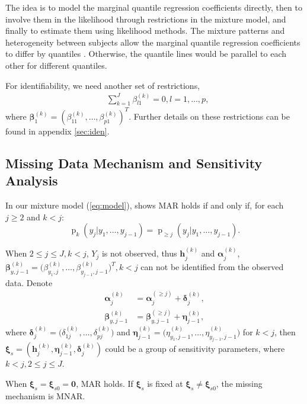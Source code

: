\documentclass[12pt]{article}
\DeclareMathOperator{\pr}{p}
\begin{document}
The idea is to model the marginal quantile regression coefficients
directly, then to involve them in the likelihood through restrictions
in the mixture model, and finally to estimate them using likelihood
methods. The mixture patterns and heterogeneity between subjects allow
the marginal quantile regression coefficients to differ by quantiles
. Otherwise, the quantile lines would be parallel to each other for
different quantiles.

For identifiability, we need another set of restrictions,
\begin{align*}
  & \sum_{k=1}^J \beta_{l1}^{(k)} = 0, l = 1,\ldots, p,
\end{align*}
where $\bm \beta_1^{(k)} = (\beta_{11}^{(k)}, \ldots,
\beta_{p1}^{(k)})^{T}$. Further details on these restrictions can be
found in appendix \ref{sec:iden}.

\subsection{Missing Data Mechanism and Sensitivity Analysis}
\label{sec:sa}

In our mixture model (\ref{eq:model}), \citep{molen1998} shows MAR
holds if and only if, for each $j \geq 2$ and $k < j$:
\begin{equation}
  \label{eq:molen}
  \pr_k(y_j|y_1, \ldots, y_{j-1}) = \pr_{\geq j}(y_j|y_1, \ldots, y_{j-1}).
\end{equation}

When $2 \leq j \leq J, k < j$, $Y_j$ is not observed, thus $\bm
h_j^{(k)}$ and $\bm \alpha_j^{(k)}$, $ \bm \beta_{y, j-1}^{(k)} =
\big(\beta_{y_1,j}^{(k)}, \ldots, \beta_{y_{j-1},j-1}^{(k)} \big)^T, k
< j$ can not be identified from the observed data. Denote
\begin{align*}
  \bm \alpha_j^{(k)} &= \bm \alpha_j^{(\geq j)} + \bm \delta_{j}^{(k)}, \\
  \bm \beta_{y, j-1}^{(k)} &= \bm \beta_{y, j-1}^{(\geq j)} + \bm
  \eta_{j-1}^{(k)},
\end{align*}
where $\bm \delta_j^{(k)} = \big( \delta_{1j}^{(k)}, \ldots,
\delta_{pj}^{(k)} \big)$ and $\bm \eta_{j-1}^{(k)} = \big(
\eta_{y_1,j-1}^{(k)}, \ldots, \eta_{y_{j-1}, j-1}^{(k)} \big)$ for $k
< j$, then $\bm \xi_s = ( \bm h_j^{(k)} , \bm \eta_{j-1}^{(k)}, \bm
\delta_j^{(k)})$ could be a group of sensitivity parameters, where $k
< j, 2 \leq j \leq J $.

When $\bm \xi_s = \bm \xi_{s0} = \bm 0$, MAR holds. If $\bm \xi_s$ is
fixed at $\bm \xi_s \neq \bm \xi_{s0}$, the missing mechanism is MNAR.
\end{document}
